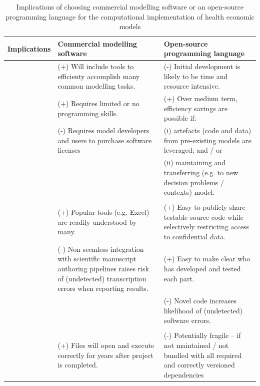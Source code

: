 \documentclass[
]{article}
\begin{document}
\begin{table}

\caption{\label{tab:proscons}Implications of choosing commercial modelling software or an open-source programming language for the computational implementation of health economic models}
\centering
\begin{tabular}[t]{>{\raggedright\arraybackslash}p{7em}>{\raggedright\arraybackslash}p{20em}>{\raggedright\arraybackslash}p{20em}}
\toprule
Implications & Commercial modelling software & Open-source programming language\\
\midrule
 & (+) Will include tools to efficienty accomplish many common modelling tasks. & (-) Initial development is likely to be time and resource intensive.\\

 & (+) Requires limited or no programming skills. & (+) Over medium term, efficiency savings are possible if:\\

 & (-) Requires model developers and users to purchase software licenses & (i)  artefacts (code and data) from pre-existing models are leveraged; and / or\\

\multirow{-4}{7em}{\raggedright\arraybackslash \textbf{Resources}} &  & (ii)    maintaining and transferring (e.g. to new decision problems / contexts) model.\\
\cmidrule{1-3}
\addlinespace[0.3em]
\multicolumn{3}{c}{\textbf{Transparency}}\\
\hspace{1em} & (+) Popular tools (e.g. Excel) are readily understood by many. & (+) Easy to publicly share testable source code while selectively restricting access to confidential data.\\

\hspace{1em} & (-) Non seemless integration with scientific manuscript authoring pipelines raises risk of (undetected) transcription errors when reporting results. & (+) Easy to make clear who has developed and tested each part.\\

\hspace{1em} &  & (-) Novel code increases likelihood of (undetected) software errors.\\

\addlinespace[0.3em]
\multicolumn{3}{c}{\textbf{Reusability}}\\
\hspace{1em} & (+) Files will open and execute correctly for years after project is completed. & (-) Potentially fragile – if not maintained / not bundled with all required and correctly versioned dependencies\\


\end{tabular}
\end{table}
\end{document}
